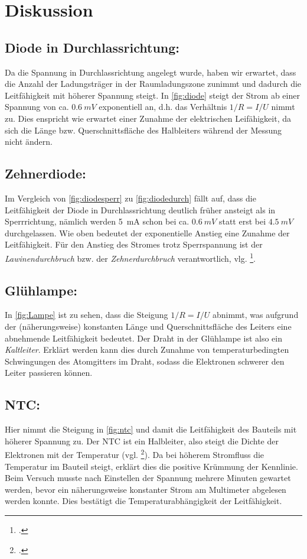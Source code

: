 \section{Diskussion}

\subsection{Diode in Durchlassrichtung:} Da die Spannung in Durchlassrichtung angelegt wurde, haben wir erwartet, dass die Anzahl der Ladungsträger in der Raumladungszone zunimmt und dadurch die Leitfähigkeit mit höherer Spannung steigt. In \cref{fig:diode} steigt der Strom ab einer Spannung von ca. $\SI{0.6}{mV}$ exponentiell an, d.h. das Verhältnis $1/R=I/U$ nimmt zu. Dies enspricht wie erwartet einer Zunahme der elektrischen Leifähigkeit, da sich die Länge bzw. Querschnittsfläche des Halbleiters während der Messung nicht ändern.

\subsection{Zehnerdiode:} Im Vergleich von \cref{fig:diodesperr} zu \cref{fig:diodedurch} fällt auf, dass die Leitfähigkeit der Diode in Durchlassrichtung deutlich früher ansteigt als in Sperrrichtung, nämlich werden \SI{5}{mA} schon bei ca. $\SI{0.6}{mV}$ statt erst bei $\SI{4.5}{mV}$ durchgelassen. Wie oben bedeutet der exponentielle Anstieg eine Zunahme der Leitfähigkeit. Für den Anstieg des Stromes trotz Sperrspannung ist der \textit{Lawinendurchbruch} bzw. der \textit{Zehnerdurchbruch} verantwortlich, vlg. \footcite{anleitung-ws2014}.

\subsection{Glühlampe:} In \cref{fig:Lampe} ist zu sehen, dass die Steigung $1/R=I/U$ abnimmt, was aufgrund der (näherungsweise) konstanten Länge und Querschnittsfläche des Leiters eine abnehmende Leitfähigkeit bedeutet. Der Draht in der Glühlampe ist also ein \textit{Kaltleiter}. Erklärt werden kann dies durch Zunahme von temperaturbedingten Schwingungen des Atomgitters im Draht, sodass die Elektronen schwerer den Leiter passieren können.

\subsection{NTC:} Hier nimmt die Steigung in \cref{fig:ntc} und damit die Leitfähigkeit des Bauteils mit höherer Spannung zu. Der NTC ist ein Halbleiter, also steigt die Dichte der Elektronen mit der Temperatur (vgl. \footcite{anleitung-ws2014}). Da bei höherem Stromfluss die Temperatur im Bauteil steigt, erklärt dies die positive Krümmung der Kennlinie. Beim Versuch musste nach Einstellen der Spannung mehrere Minuten gewartet werden, bevor ein näherungsweise konstanter Strom am Multimeter abgelesen werden konnte. Dies bestätigt die Temperaturabhängigkeit der Leitfähigkeit.

